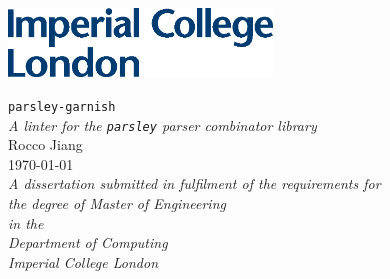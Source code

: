 \documentclass[a4paper, 10pt]{report}
\providecommand{\chaptertitle}{}
\newcommand{\ourchapterstar}[1]{\pagebreak\chapter*{#1}\renewcommand{\chaptertitle}{}}
\newcommand{\authorname}{Rocco Jiang}
\newcommand{\maintitle}{\texttt{parsley-garnish}}
\newcommand{\mainsubtitle}{\emph{A linter for the \texttt{parsley} parser combinator library}}
\newcommand{\TODO}[1]{{\color{DarkRed}#1}}
\begin{document}

\hypersetup{pageanchor=false}
\begin{titlepage}
    \vspace*{-13.5mm}\hspace{-30.6mm}\hspace{17.5mm}\includegraphics[width=7cm]{assets/logo.eps}
    \vspace*{\fill}
    \begin{center}
      {\Huge{\maintitle}}\\[0.4cm]
      {\Large{\mainsubtitle}}\\[1.6cm]
      {\Large{\authorname}}\\[0.2cm]
      {\today}\\[4.0cm]
      \vspace*{\fill}
      {\emph{A dissertation submitted in fulfilment of the requirements for\\ the degree of Master of Engineering}}\\[0.3cm]
      {\emph{in the}}\\[0.4cm]
      {\emph{Department of Computing}}\\
      {\emph{Imperial College London}}\\
    \end{center}
\end{titlepage}

\clearpage %
\setcounter{page}{1}
\setcounter{tocdepth}{2}
\hypersetup{pageanchor=true}

%


%

\pagebreak
\tableofcontents
\pagebreak
\listoffigures

\pagebreak
{}

%
%
%
%
%

\pagebreak
{}
\renewcommand{\chaptertitle}{Bibliography}
\printbibliography[heading=bibintoc]

\pagebreak
\renewcommand{\chaptertitle}{Appendices}
\appendix
%
\end{document}
